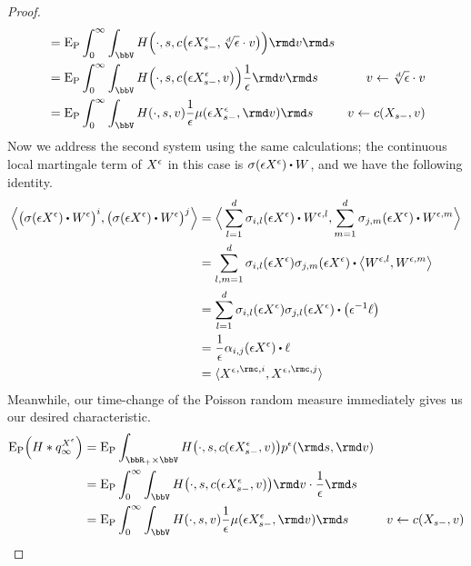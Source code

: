 \begin{proof}
\begin{align*}
    &= \Exp_\Prb \int_0^\infty \int_\vecSpace H\Big(\cdot, s, \thinner\big(\Xe_{s-}, \sqrt[d]{\epsilon} \cdot \markVar\big) \Big) \rmd\markVar\rmd s \\
    &= \Exp_\Prb \int_0^\infty \int_\vecSpace H\Big(\cdot, s, \thinner\big(\Xe_{s-}, \markVar\big) \Big) \frac1\epsilon \rmd\markVar \rmd s & \markVar \leftarrow \sqrt[d]{\epsilon} \cdot \markVar \\
    &= \Exp_\Prb \int_0^\infty \int_\vecSpace H(\cdot, s, \markVar) \frac1\epsilon \affJump(\Xe_{s-}, \rmd\markVar) \rmd s & \markVar \leftarrow \thinner(\X_{s-}, \markVar)
  \end{align*}
  Now we address the second system using the same calculations; the continuous local martingale term of $X^\epsilon$ in this case is $\affDiffSqrt(\Xe)\shortInt\W$, and we have the following identity.
  \begin{align*}
    \Bprj{\big(\affDiffSqrt(\Xe) \shortInt \W^\epsilon\big)^i}{\big(\affDiffSqrt(\Xe) \shortInt\W^\epsilon\big)^j}
    &= \Bprj{\sum_{l=1}^d \affDiffSqrt_{i,l}(\Xe) \shortInt\W^{\epsilon,l}}{\sum_{m=1}^d \affDiffSqrt_{j,m}(\Xe) \shortInt\W^{\epsilon,m}} \\
    &= \sum_{l,m=1}^d \affDiffSqrt_{i,l}(\Xe)\affDiffSqrt_{j,m}(\Xe) \shortInt \bprj{\W^{\epsilon,l}}{\W^{\epsilon,m}} \\
    &= \sum_{l=1}^d \affDiffSqrt_{i,l}(\Xe)\affDiffSqrt_{j,l}(\Xe) \shortInt \big( \epsilon^{-1} \leb \big) \\
    &= \frac1\epsilon \affDiff_{i,j}(\Xe) \shortInt \leb \\
    &= \prj{{\Xee}^{,\rmc,i}}{{\Xee}^{,\rmc,j}}
  \end{align*}
  Meanwhile, our time-change of the Poisson random measure immediately gives us our desired characteristic.
  \begin{align*}
    \Exp_\Prb\Big( H \ast \jumpMeas^{\Xee}_\infty \Big)
    &= \Exp_\Prb \int_{\bbR_+\times\vecSpace} H\big(\cdot, s, \thinner(\Xe_{s-}, \markVar) \big) \poisRM^\epsilon(\rmd s, \rmd\markVar) \\
    &= \Exp_\Prb \int_0^\infty \int_\vecSpace H\big(\cdot, s, \thinner(\Xe_{s-}, \markVar) \big) \rmd\markVar \cdot \frac1\epsilon \rmd s \\
    &= \Exp_\Prb \int_0^\infty \int_\vecSpace H(\cdot, s, \markVar) \frac1\epsilon \affJump(\Xe_{s-}, \rmd\markVar) \rmd s & \markVar \leftarrow \thinner(\X_{s-}, \markVar)
  \end{align*}
\end{proof}
